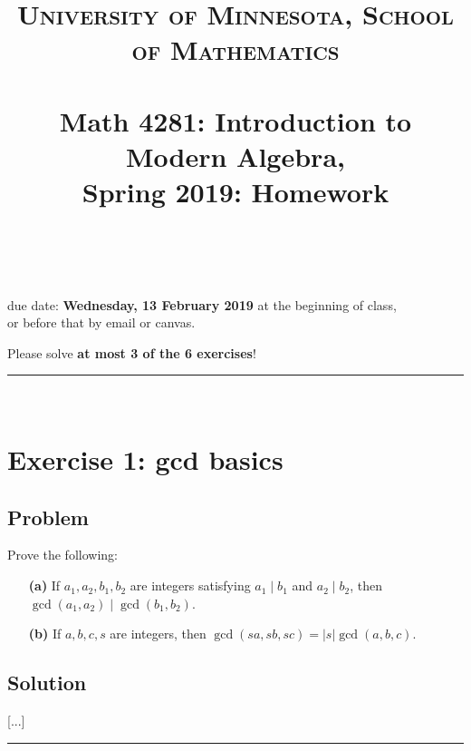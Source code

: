 \documentclass[paper=a4, fontsize=12pt]{scrartcl} %
\title{	
\normalfont \normalsize 
\textsc{University of Minnesota, School of Mathematics} \\ [25pt] %
\horrule{0.5pt} \\[0.4cm] %
\huge Math 4281: Introduction to Modern Algebra, \\
Spring 2019:
Homework \psetnumber\\%
\horrule{2pt} \\[0.5cm] %
}
\author{\myname}
\newcommand{\abs}[1]{\left| #1 \right|}
\newcommand{\tup}[1]{\left( #1 \right)}
\newcommand{\horrule}[1]{\rule{\linewidth}{#1}} %
\theoremstyle{plainsl}
\theoremstyle{definition}
\theoremstyle{remark}
\begin{document}
\maketitle %

\begin{center} %
{\large due date: \textbf{Wednesday, 13 February 2019} at the beginning of class, \\
or before that by email or canvas.

Please solve \textbf{at most 3 of the 6 exercises}!}
\end{center}

\horrule{0.3pt} \\[0.4cm]

\section{Exercise 1: gcd basics}

\subsection{Problem}

Prove the following:

\begin{enumerate}

\item[\textbf{(a)}]
If $a_1, a_2, b_1, b_2$ are integers satisfying $a_1 \mid b_1$
and $a_2 \mid b_2$, then
$\gcd\tup{a_1, a_2} \mid \gcd\tup{b_1, b_2}$.

\item[\textbf{(b)}]
If $a, b, c, s$ are integers, then
$\gcd\tup{sa, sb, sc} = \abs{s} \gcd\tup{a, b, c}$.

\end{enumerate}

\subsection{Solution}

[...]

\horrule{0.3pt} \\[0.4cm]
\end{document}
